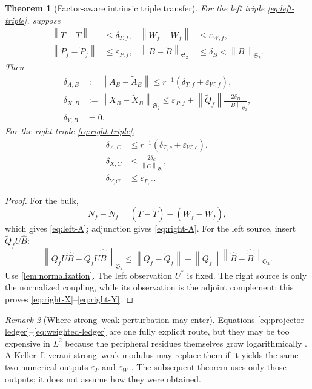 \documentclass[11pt]{article}
\newtheorem{theorem}{Theorem}[section]
\theoremstyle{definition}
\theoremstyle{remark}
\newtheorem{remark}[theorem]{Remark}
\newcommand{\HS}{\mathfrak S_2}
\newcommand{\norm}[1]{\left\lVert #1\right\rVert}
\begin{document}
\begin{theorem}[Factor-aware intrinsic triple transfer]
\label{thm:factor-transfer}
For the left triple \eqref{eq:left-triple}, suppose
\begin{align*}
 \norm{T-\widetilde T}&\le\delta_{T,f},&
 \norm{W_f-\widetilde W_f}&\le\varepsilon_{W,f},\\
 \norm{P_f-\widetilde P_f}&\le\varepsilon_{P,f},&
 \norm{B-\widetilde B}_{\HS}&\le\delta_B<\norm B_{\HS}.
\end{align*}
Then
\begin{align}
 \delta_{A,B}
 &:=\norm{A_B-\widetilde A_B}
 \le r^{-1}(\delta_{T,f}+\varepsilon_{W,f}),
 \label{eq:left-A}\\
 \delta_{X,B}
 &:=\norm{X_B-\widetilde X_B}_{\HS}
 \le\varepsilon_{P,f}
 +\norm{\widetilde Q_f}
 \frac{2\delta_B}{\norm B_{\HS}},
 \label{eq:left-X}\\
 \delta_{Y,B}&=0.
 \label{eq:left-Y}
\end{align}
For the right triple \eqref{eq:right-triple},
\begin{align}
 \delta_{A,C}
 &\le r^{-1}(\delta_{T,c}+\varepsilon_{W,c}),
 \label{eq:right-A}\\
 \delta_{X,C}
 &\le\frac{2\delta_C}{\norm C_{\HS}},
 \label{eq:right-X}\\
 \delta_{Y,C}&\le\varepsilon_{P,c}.
 \label{eq:right-Y}
\end{align}
\end{theorem}

\begin{proof}
For the bulk,
\[
 N_f-\widetilde N_f
 =(T-\widetilde T)-(W_f-\widetilde W_f),
\]
which gives \eqref{eq:left-A}; adjunction gives \eqref{eq:right-A}.
For the left source, insert $\widetilde Q_fU\widehat B$:
\[
 \norm{Q_fU\widehat B-
 \widetilde Q_fU\widehat{\widetilde B}}_{\HS}
 \le\norm{Q_f-\widetilde Q_f}
 +\norm{\widetilde Q_f}
  \norm{\widehat B-\widehat{\widetilde B}}_{\HS}.
\]
Use \cref{lem:normalization}.  The left observation $U^*$ is fixed.  The
right source is only the normalized coupling, while its observation is the
adjoint complement; this proves \eqref{eq:right-X}--\eqref{eq:right-Y}.
\end{proof}

\begin{remark}[Where strong--weak perturbation may enter]
\label{rem:strong-weak}
Equations \eqref{eq:projector-ledger}--\eqref{eq:weighted-ledger} are one
fully explicit route, but they may be too expensive in $L^2$ because the
peripheral residues themselves grow logarithmically
\citep{WangLogConditioning2026}.  A Keller--Liverani strong--weak modulus
may replace them if it yields the same two numerical outputs
$\varepsilon_P$ and $\varepsilon_W$ \citep{KellerLiverani1999}.  The
subsequent theorem uses only those outputs; it does not assume how they were
obtained.
\end{remark}
\end{document}
